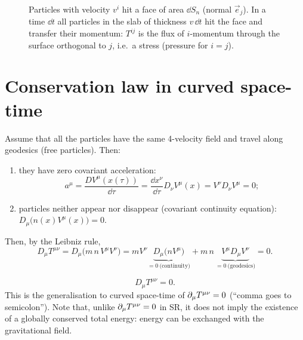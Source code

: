 \begin{figure}[ht]
\centering
{}
\caption{Particles with velocity $v^i$ hit a face of area $\dd S_n$ (normal $\vec e_j$). In a time $\dd t$ all particles in the slab of thickness $v\,\dd t$ hit the face and transfer their momentum: $T^{ij}$ is the flux of $i$-momentum through the surface orthogonal to $j$, i.e.\ a stress (pressure for $i=j$).}
\label{fig:box}
\end{figure}

\section{Conservation law in curved space-time}

Assume that all the particles have the same 4-velocity field and travel along geodesics (free particles). Then:
\begin{enumerate}
\item they have zero covariant acceleration:
\begin{equation}
  a^\mu=\frac{DV^\mu(x(\tau))}{\dd\tau}=\frac{\dd x^\nu}{\dd\tau}D_\nu V^\mu(x)=V^\nu D_\nu V^\mu=0 ;
\end{equation}
\item particles neither appear nor disappear (covariant continuity equation): $D_\mu\big(n(x)V^\mu(x)\big)=0$.
\end{enumerate}
Then, by the Leibniz rule,
\begin{equation}
  D_\mu T^{\mu\nu}=D_\mu\big(m\,n\,V^\mu V^\nu\big)=m V^\nu\underbrace{D_\mu\big(nV^\mu\big)}_{=0\ \text{(continuity)}}+m\,n\,\underbrace{V^\mu D_\mu V^\nu}_{=0\ \text{(geodesics)}}=0 .
\end{equation}

\begin{keyresult}
\begin{equation}
  D_\mu T^{\mu\nu}=0 .
\end{equation}
This is the generalisation to curved space-time of $\partial_\mu T^{\mu\nu}=0$ (``comma goes to semicolon''). Note that, unlike $\partial_\mu T^{\mu\nu}=0$ in SR, it does not imply the existence of a globally conserved total energy: energy can be exchanged with the gravitational field.
\end{keyresult}


